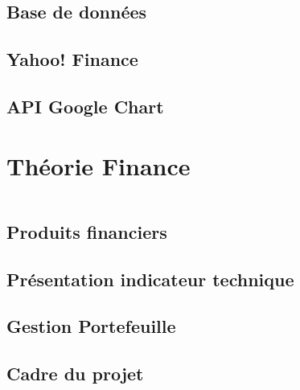 \documentclass{beamer}
\begin{document}
	     \subsection{Base de données}
	            
	    \subsection{Yahoo! Finance}
	        
	    \subsection{API Google Chart}
	               
        	
     \section{Théorie Finance}
       \begin{frame}
            \begin{columns}[t]
  				\begin{column}{5cm}
  					\tableofcontents[sections={1-4}, currentsection, hideothersubsections]
  				\end{column}
  				\begin{column}{5cm}
  				\tableofcontents[sections={5-9}, currentsection, hideothersubsections]
  				\end{column}
  			\end{columns}
        \end{frame}
        \subsection{Produits financiers}
	        
	    \subsection{Présentation indicateur technique}
	            
		\subsection{Gestion Portefeuille}
	         
	    \subsection{Cadre du projet}
	            
	        
\end{document}
